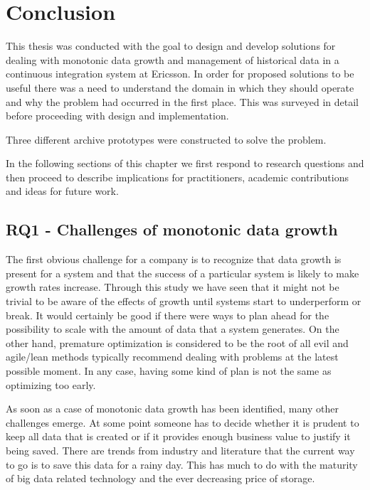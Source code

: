 \chapter{Conclusion}
\label{chap:conclusion}
This thesis was conducted with the goal to design and develop solutions for dealing with monotonic data growth and management of historical data in a continuous integration system at Ericsson. In order for proposed solutions to be useful there was a need to understand the domain in which they should operate and why the problem had occurred in the first place. This was surveyed in detail before proceeding with design and implementation. 

Three different archive prototypes were constructed to solve the problem.

In the following sections of this chapter we first respond to research questions and then proceed to describe implications for practitioners, academic contributions and ideas for future work.


\section{RQ1 - Challenges of monotonic data growth}
The first obvious challenge for a company is to recognize that data growth is present for a system and that the success of a particular system is likely to make growth rates increase. Through this study we have seen that it might not be trivial to be aware of the effects of growth until systems start to underperform or break. It would certainly be good if there were ways to plan ahead for the possibility to scale with the amount of data that a system generates. On the other hand, premature optimization is considered to be the root of all evil and agile/lean methods typically recommend dealing with problems at the latest possible moment. In any case, having some kind of plan is not the same as optimizing too early.

As soon as a case of monotonic data growth has been identified, many other challenges emerge. At some point someone has to decide whether it is prudent to keep all data that is created or if it provides enough business value to justify it being saved. There are trends from industry and literature that the current way to go is to save this data for a rainy day. This has much to do with the maturity of big data related technology and the ever decreasing price of storage.

